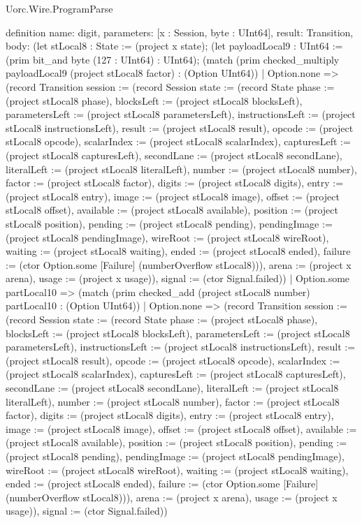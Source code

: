 \begin{lexlean}{Uorc.Wire.ProgramParse}
\begin{semanticmodule}
definition{
  name: digit,
  parameters: [x : Session, byte : UInt64],
  result: Transition,
  body: (let stLocal8 : State := (project x state); (let payloadLocal9 : UInt64 := (prim bit_and byte (127 : UInt64) : UInt64); (match (prim checked_multiply payloadLocal9 (project stLocal8 factor) : (Option UInt64))
    | Option.none => (record Transition {session := (record Session {state := (record State {phase := (project stLocal8 phase), blocksLeft := (project stLocal8 blocksLeft), parametersLeft := (project stLocal8 parametersLeft), instructionsLeft := (project stLocal8 instructionsLeft), result := (project stLocal8 result), opcode := (project stLocal8 opcode), scalarIndex := (project stLocal8 scalarIndex), capturesLeft := (project stLocal8 capturesLeft), secondLane := (project stLocal8 secondLane), literalLeft := (project stLocal8 literalLeft), number := (project stLocal8 number), factor := (project stLocal8 factor), digits := (project stLocal8 digits), entry := (project stLocal8 entry), image := (project stLocal8 image), offset := (project stLocal8 offset), available := (project stLocal8 available), position := (project stLocal8 position), pending := (project stLocal8 pending), pendingImage := (project stLocal8 pendingImage), wireRoot := (project stLocal8 wireRoot), waiting := (project stLocal8 waiting), ended := (project stLocal8 ended), failure := (ctor Option.some [Failure] (numberOverflow stLocal8))}), arena := (project x arena), usage := (project x usage)}), signal := (ctor Signal.failed)})
    | Option.some partLocal10 => (match (prim checked_add (project stLocal8 number) partLocal10 : (Option UInt64))
      | Option.none => (record Transition {session := (record Session {state := (record State {phase := (project stLocal8 phase), blocksLeft := (project stLocal8 blocksLeft), parametersLeft := (project stLocal8 parametersLeft), instructionsLeft := (project stLocal8 instructionsLeft), result := (project stLocal8 result), opcode := (project stLocal8 opcode), scalarIndex := (project stLocal8 scalarIndex), capturesLeft := (project stLocal8 capturesLeft), secondLane := (project stLocal8 secondLane), literalLeft := (project stLocal8 literalLeft), number := (project stLocal8 number), factor := (project stLocal8 factor), digits := (project stLocal8 digits), entry := (project stLocal8 entry), image := (project stLocal8 image), offset := (project stLocal8 offset), available := (project stLocal8 available), position := (project stLocal8 position), pending := (project stLocal8 pending), pendingImage := (project stLocal8 pendingImage), wireRoot := (project stLocal8 wireRoot), waiting := (project stLocal8 waiting), ended := (project stLocal8 ended), failure := (ctor Option.some [Failure] (numberOverflow stLocal8))}), arena := (project x arena), usage := (project x usage)}), signal := (ctor Signal.failed)})
}
\end{semanticmodule}
\end{lexlean}
